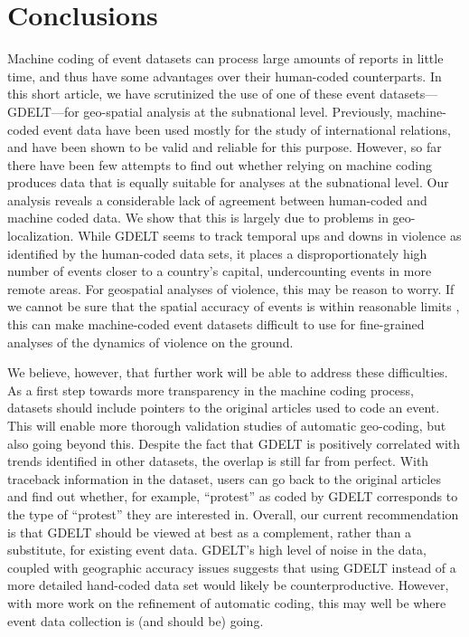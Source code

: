 \documentclass[hidelinks]{article}
\begin{document}
\section*{Conclusions}

Machine coding of event datasets can process large amounts of reports in little time, and thus have some advantages over their human-coded counterparts. In this short article, we have scrutinized the use of one of these event datasets---GDELT---for geo-spatial analysis at the subnational level. Previously, machine-coded event data have been used mostly for the study of international relations, and have been shown to be valid and reliable for this purpose. However, so far there have been few attempts to find out whether relying on machine coding produces data that is equally suitable for analyses at the subnational level. Our analysis reveals a considerable lack of agreement between human-coded and machine coded data. We show that this is largely due to problems in geo-localization. While GDELT seems to track temporal ups and downs in violence as identified by the human-coded data sets, it places a disproportionately high number of events closer to a country's capital, undercounting events in more remote areas. For geospatial analyses of violence, this may be reason to worry. If we cannot be sure that the spatial accuracy of events is within reasonable limits \citep{weidmann15accuracy}, this can make machine-coded event datasets difficult to use for fine-grained analyses of the dynamics of violence on the ground. 

We believe, however, that further work will be able to address these difficulties. As a first step towards more transparency in the machine coding process, datasets should include pointers to the original articles used to code an event. This will enable more thorough validation studies of automatic geo-coding, but also going beyond this. Despite the fact that GDELT is positively correlated with trends identified in other datasets, the overlap is still far from perfect. With traceback information in the dataset, users can go back to the original articles and find out whether, for example, ``protest'' as coded by GDELT corresponds to the type of ``protest'' they are interested in. Overall, our current recommendation is that GDELT should be viewed at best as a complement, rather than a substitute, for existing event data. GDELT's high level of noise in the data, coupled with geographic accuracy issues suggests that using GDELT instead of a more detailed hand-coded data set would likely be counterproductive. However, with more work on the refinement of automatic coding, this may well be where event data collection is (and should be) going.



\end{document}
